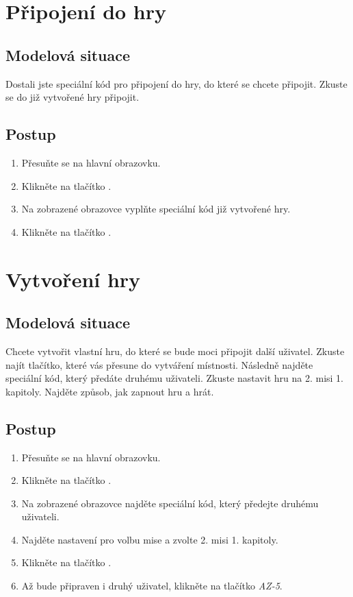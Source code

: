 \section{Připojení do hry}

\subsection*{Modelová situace}

Dostali jste speciální kód pro připojení do hry,
do které se chcete připojit.
Zkuste se do již vytvořené hry připojit.

\subsection*{Postup}

\begin{enumerate}
    \item Přesuňte se na hlavní obrazovku.
    \item Klikněte na tlačítko .
    \item Na zobrazené obrazovce vyplňte speciální kód již vytvořené hry.
    \item Klikněte na tlačítko .
\end{enumerate}

\section{Vytvoření hry}

\subsection*{Modelová situace}

Chcete vytvořit vlastní hru,
do které se bude moci připojit další uživatel.
Zkuste najít tlačítko,
které vás přesune do vytváření místnosti.
Následně najděte speciální kód,
který předáte druhému uživateli.
Zkuste nastavit hru na 2. misi 1. kapitoly.
Najděte způsob, jak zapnout hru a hrát.

\subsection*{Postup}

\begin{enumerate}
    \item Přesuňte se na hlavní obrazovku.
    \item Klikněte na tlačítko .
    \item Na zobrazené obrazovce najděte speciální kód,
    který předejte druhému uživateli.
    \item Najděte nastavení pro volbu mise a zvolte 2. misi 1. kapitoly.
    \item Klikněte na tlačítko .
    \item Až bude připraven i druhý uživatel,
    klikněte na tlačítko \emph{AZ-5}.
\end{enumerate}

